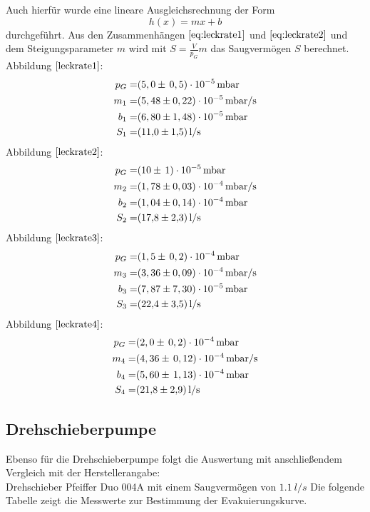 Auch hierfür wurde eine lineare Ausgleichsrechnung der Form
\begin{equation}
	h(x)=mx+b
\end{equation}
durchgeführt.
Aus den Zusammenhängen $\ref{eq:leckrate1}$ und $\ref{eq:leckrate2}$ und dem Steigungsparameter $m$ wird mit $S=\frac{V}{p_G}m$
das Saugvermögen $S$ berechnet.\\

Abbildung $\ref{leckrate1}$:
	\begin{align*}
		p_G=& (5,0 \pm \, 0,5)\cdot 10^{-5} \, \si{mbar}\\
		m_1=& (5,48 \pm 0,22)\cdot 10^{-5} \, \si{mbar/s}\\
		b_1=& (6,80 \pm 1,48)\cdot 10^{-5} \, \si{mbar}\\
		S_1=& \SI{11,0 \pm 1,5}{l/s}
	\end{align*}
	Abbildung $\ref{leckrate2}$:
		\begin{align*}
			p_G=& (10 \pm \, 1)\cdot 10^{-5} \, \si{mbar}\\
			m_2=& (1,78 \pm 0,03)\cdot 10^{-4} \, \si{mbar/s}\\
			b_2=& (1,04 \pm 0,14)\cdot 10^{-4} \, \si{mbar}\\
			S_2=& \SI{17,8 \pm 2,3}{l/s}
		\end{align*}
		Abbildung $\ref{leckrate3}$:
			\begin{align*}
				p_G=& (1,5 \pm \, 0,2)\cdot 10^{-4} \, \si{mbar}\\
				m_3=& (3,36 \pm 0,09)\cdot 10^{-4} \, \si{mbar/s}\\
				b_3=& (7,87 \pm 7,30)\cdot 10^{-5} \, \si{mbar}\\
				S_3=& \SI{22,4 \pm 3,5}{l/s}
			\end{align*}
		Abbildung $\ref{leckrate4}$:
			\begin{align*}
				p_G=& (2,0 \pm \, 0,2)\cdot 10^{-4} \, \si{mbar}\\
				m_4=& (4,36 \pm \, 0,12)\cdot 10^{-4} \, \si{mbar/s}\\
				b_4=& (5,60 \pm \, 1,13)\cdot 10^{-4} \, \si{mbar}\\
				S_4=& \SI{21,8 \pm 2,9}{l/s}
			\end{align*}

\subsection{Drehschieberpumpe}
Ebenso für die Drehschieberpumpe folgt die Auswertung mit anschließendem Vergleich mit der
Herstellerangabe\cite{anleitung}:\\
Drehschieber Pfeiffer Duo 004A mit einem Saugvermögen von $\SI{1,1}{l/s}$\newpage
Die folgende Tabelle zeigt die Messwerte zur Bestimmung der Evakuierungskurve.
